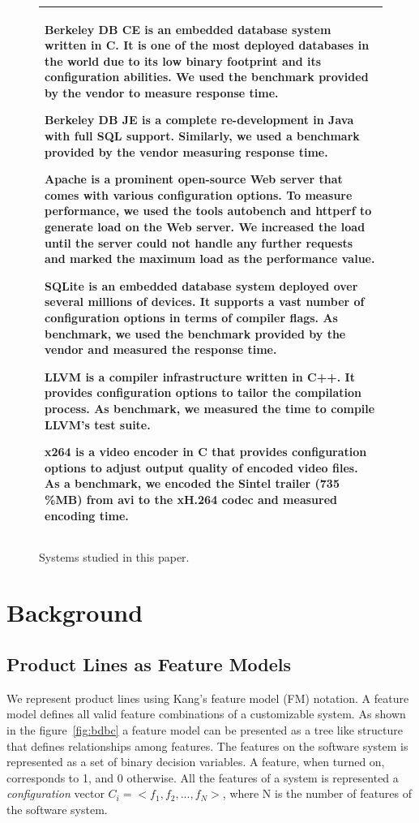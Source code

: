 \documentclass{sig-alternative}
\begin{document}
\begin{figure}\small
\begin{tabular}{|p{.95\linewidth}|}\hline
\textbf{Berkeley DB CE} is an embedded database system written in C. It is one of the most deployed databases in the world due to its low binary footprint and its configuration abilities. We used the benchmark provided by the vendor to measure response time.

\textbf{Berkeley DB JE} is a complete re-development in Java with full SQL support. Similarly, we used a benchmark provided by the vendor measuring response time.

\textbf{Apache} is a prominent open-source Web server that comes with various configuration options. To measure performance, we used the tools autobench and httperf to generate load on the Web server. We increased the load until the server could not handle any further requests and marked the maximum load as the performance value.

\textbf{SQLite} is an embedded database system deployed over several millions of devices. It supports a vast number of configuration options in terms of compiler flags. As benchmark, we used the benchmark provided by the vendor and measured the response time.

\textbf{LLVM} is a compiler infrastructure written in C++. It provides configuration options to tailor the compilation process. As benchmark, we measured the time to compile LLVM's test suite.

\textbf{x264} is a video encoder in C that provides configuration options to adjust output quality of encoded video files. As a benchmark, we encoded the Sintel trailer (735\,\%MB) from avi to the xH.264 codec and measured encoding time.\\\hline
\end{tabular}
\caption{Systems studied in this paper.}\label{fig:systems}
\end{figure}



\section{Background}  

\subsection{Product Lines as Feature Models}
We represent product lines using Kang's feature model (FM) notation. 
A feature model defines all valid feature combinations of a customizable system. As shown in the figure~\ref{fig:bdbc} a feature model can be presented as a tree like structure that defines relationships among features.   The features on the software system is represented as a set of binary decision variables. A feature, when turned on, corresponds to 1, and 0 otherwise. All the features of a system is represented a {\em configuration} vector  $C_i= <f_1, f_2, ...,f_N>$, where N is the number of features of the software system.  
    
\end{document}
